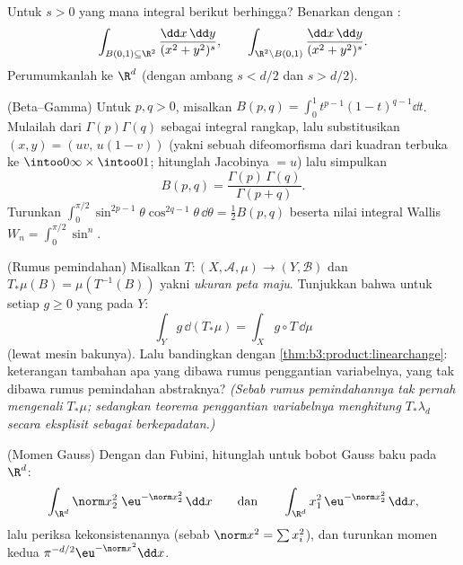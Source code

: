 \begin{exercise}[$\star\star$]\label{exo:b3:product:7}
Untuk $s > 0$ yang mana integral berikut berhingga? Benarkan dengan :
\[
\int_{B(0,1)\subseteq\R^2}\frac{\dd x\,\dd y}{(x^2 +
y^2)^{s}},
\qquad
\int_{\R^2\setminus B(0,1)}\frac{\dd x\,\dd y}{(x^2 +
y^2)^{s}} .
\]
Perumumkanlah ke $\R^d$ (dengan ambang $s < d/2$ dan $s > d/2$).
\end{exercise}

\begin{exercise}[$\star\star\star$]\label{exo:b3:product:8}
(Beta--Gamma) Untuk $p, q > 0$, misalkan $B(p, q) = \int_0^1t^{p-1}(1
- t)^{q-1}\dd t$. Mulailah dari $\Gamma(p)\Gamma(q)$ sebagai
integral rangkap, lalu substitusikan $(x, y) = (uv,\, u(1 - v))$ (yakni sebuah
difeomorfisma dari kuadran terbuka ke
$\intoo0\infty\times\intoo01$; hitunglah Jacobinya $= u$) lalu
simpulkan
\[
B(p, q) = \frac{\Gamma(p)\,\Gamma(q)}{\Gamma(p + q)} .
\]
Turunkan $\int_0^{\pi/2}\sin^{2p-1}\theta\cos^{2q-1}\theta\,
\dd\theta = \frac12B(p,q)$ beserta nilai integral
Wallis $W_n = \int_0^{\pi/2}\sin^n$.
\end{exercise}

\begin{exercise}[$\star\star$]\label{exo:b3:product:9}
(Rumus pemindahan) Misalkan $T \colon (X, \mathcal A, \mu) \to (Y,
\mathcal B)$  dan $T_*\mu(B) = \mu(T^{-1}(B))$
yakni \emph{ukuran peta maju}.
Tunjukkan bahwa untuk setiap $g \geq 0$ yang  pada $Y$:
\[
\int_Y g\,\dd(T_*\mu) = \int_X g\circ T\,\dd\mu
\]
(lewat mesin bakunya). Lalu bandingkan dengan
\cref{thm:b3:product:linearchange}: keterangan tambahan apa yang dibawa
rumus penggantian variabelnya, yang tak dibawa
rumus pemindahan abstraknya? \emph{(Sebab rumus pemindahannya tak pernah
mengenali $T_*\mu$; sedangkan teorema penggantian variabelnya menghitung
$T_*\lambda_d$ secara eksplisit sebagai  berkepadatan.)}
\end{exercise}

\begin{exercise}[$\star\star\star$]\label{exo:b3:product:10}
(Momen Gauss) Dengan  dan Fubini, hitunglah
untuk bobot Gauss baku pada $\R^d$:
\[
\int_{\R^d}\norm x_2^2\;\eu^{-\norm x_2^2}\,\dd x
\qquad\text{dan}\qquad
\int_{\R^d}x_1^2\,\eu^{-\norm x^2_2}\,\dd x,
\]
lalu periksa kekonsistenannya (sebab $\norm x^2 = \sum x_i^2$), dan turunkan
momen kedua 
$\pi^{-d/2}\eu^{-\norm x^2}\dd x$.
\end{exercise}


